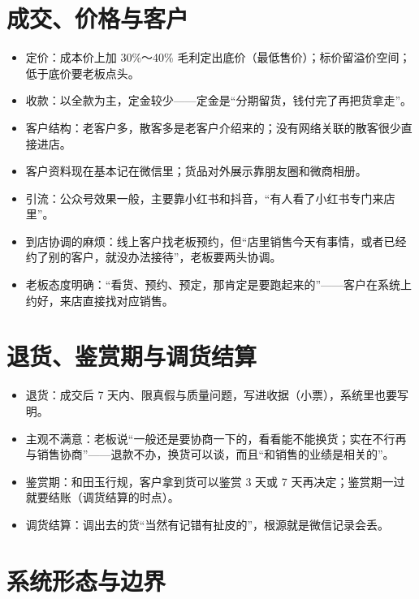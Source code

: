 \documentclass[12pt, a4paper]{ctexart}
\begin{document}
\section{成交、价格与客户}

\begin{itemize}[leftmargin=1.6em, itemsep=2pt]
  \item 定价：成本价上加 30\%～40\% 毛利定出底价（最低售价）；标价留溢价空间；低于底价要老板点头。
  \item 收款：以全款为主，定金较少——定金是“分期留货，钱付完了再把货拿走”。
  \item 客户结构：老客户多，散客多是老客户介绍来的；没有网络关联的散客很少直接进店。
  \item 客户资料现在基本记在微信里；货品对外展示靠朋友圈和微商相册。
  \item 引流：公众号效果一般，主要靠小红书和抖音，“有人看了小红书专门来店里”。
  \item 到店协调的麻烦：线上客户找老板预约，但“店里销售今天有事情，或者已经约了别的客户，就没办法接待”，老板要两头协调。
  \item 老板态度明确：“看货、预约、预定，那肯定是要跑起来的”——客户在系统上约好，来店直接找对应销售。
\end{itemize}

\section{退货、鉴赏期与调货结算}

\begin{itemize}[leftmargin=1.6em, itemsep=2pt]
  \item 退货：成交后 7 天内、限真假与质量问题，写进收据（小票），系统里也要写明。
  \item 主观不满意：老板说“一般还是要协商一下的，看看能不能换货；实在不行再与销售协商”——退款不办，换货可以谈，而且“和销售的业绩是相关的”。
  \item 鉴赏期：和田玉行规，客户拿到货可以鉴赏 3 天或 7 天再决定；鉴赏期一过就要结账（调货结算的时点）。
  \item 调货结算：调出去的货“当然有记错有扯皮的”，根源就是微信记录会丢。
\end{itemize}

\section{系统形态与边界}
\end{document}
